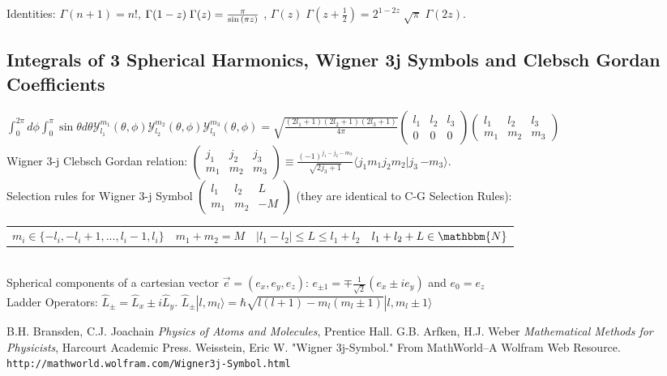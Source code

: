 \documentclass[10.5pt,letterpaper]{article}
\begin{document}
Identities: $\Gamma(n+1)=n!$\space \space, \space \space $ \Gamma(1-z) \; \Gamma(z) = {\pi \over \sin{(\pi z)}} \,\! $ \space \space, \space \space  $\Gamma(z) \; \Gamma\left(z + \frac{1}{2}\right) = 2^{1-2z} \; \sqrt{\pi} \; \Gamma(2z). \,\! $


\subsection*{Integrals of 3 Spherical Harmonics, Wigner 3j Symbols and Clebsch Gordan Coefficients}

$\int_0^{2 \pi} d\phi \int_0^{\pi} \sin \theta d\theta \mathcal{Y}_{l_1}^{m_1}(\theta,\phi) \mathcal{Y}_{l_2}^{m_2}(\theta,\phi) \mathcal{Y}_{l_3}^{m_3}(\theta,\phi)=\sqrt{\frac{(2l_1+1)(2l_2+1)(2l_3+1)}{4 \pi}} \begin{pmatrix}
  l_1 & l_2 & l_3\\
  0 & 0 & 0
\end{pmatrix}
\begin{pmatrix}
  l_1 & l_2 & l_3\\
  m_1 & m_2 & m_3
\end{pmatrix}
$
\\

Wigner 3-j Clebsch Gordan relation:
$
\begin{pmatrix}
  j_1 & j_2 & j_3\\
  m_1 & m_2 & m_3
\end{pmatrix}
\equiv \frac{(-1)^{j_1-j_2-m_3}}{\sqrt{2j_3+1}} \langle j_1 m_1 j_2 m_2 | j_3 \, {-m_3} \rangle.$\\

Selection rules for Wigner 3-j Symbol $\begin{pmatrix}  l_1 & l_2 & L\\   m_1 & m_2 & -M \end{pmatrix}$ (they are identical to C-G Selection Rules):

\begin{tabular}{llll}
$m_i \in  \{-l_i,-l_i+1,...,l_i-1,l_i\}$ & $m_1+m_2=M$ & $|l_1-l_2|\leqslant L \leqslant l_1+l_2$ & $l_1+l_2+L \in \mathbbm{N}$  \\ 
\end{tabular}
\\

Spherical components of a cartesian vector $\vec e=(e_x,e_y,e_z)$: $e_{\pm 1}=\mp \frac{1}{\sqrt{2}} \left( e_x\pm i e_y \right)$ and $e_0=e_z$\\

Ladder Operators: $ \hat L_{\pm}=\hat L_x\pm i \hat L_y$. \space \space \space $\hat L_{\pm} |l,m_l \rangle=\hbar \sqrt{l(l+1)-m_l(m_l\pm1)}|l,m_l\pm1 \rangle$


\begin{thebibliography}{}
\bibitem{} B.H. Bransden, C.J. Joachain \textit{Physics of Atoms and Molecules}, Prentice Hall.
\bibitem{} G.B. Arfken, H.J. Weber \textit{Mathematical Methods for Physicists}, Harcourt Academic Press.
\bibitem{} Weisstein, Eric W. "Wigner 3j-Symbol." From MathWorld--A Wolfram Web Resource. \verb|http://mathworld.wolfram.com/Wigner3j-Symbol.html|
\end{thebibliography}
\end{document}

